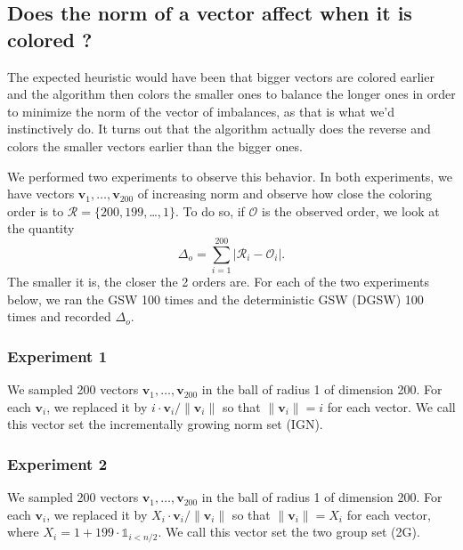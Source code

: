 \documentclass[12pt]{article}
\begin{document}
\subsection{Does the norm of a vector affect when it is colored ?}\label{norm_affect_when}
The expected heuristic would have been that bigger vectors are colored earlier and the algorithm then colors the smaller ones to balance the longer ones in order to minimize the norm of the vector of imbalances, as that is what we'd instinctively do. It turns out that the algorithm actually does the reverse and colors the smaller vectors earlier than the bigger ones.

We performed two experiments to observe this behavior. In both experiments, we have vectors $\textbf{v}_1,\dots,\textbf{v}_{200}$ of increasing norm and observe how close the coloring order is to $\mathcal{R}=\{200,199,$\dots$,1\}$. To do so, if $\mathcal{O}$ is the observed order, we look at the quantity 
\begin{equation}
\Delta_{o}=\sum_{i=1}^{200}|\mathcal{R}_i-\mathcal{O}_i|.
\label{orderdistance}
\end{equation}
The smaller it is, the closer the 2 orders are. For each of the two experiments below, we ran the GSW 100 times and the deterministic GSW (DGSW) 100 times and recorded $\Delta_o$.

\subsubsection{Experiment 1}
We sampled 200 vectors $\textbf{v}_1,\dots,\textbf{v}_{200}$ in the ball of radius 1 of dimension 200. For each $\textbf{v}_i$, we replaced it by $i\cdot \textbf{v}_i/\|\textbf{v}_i\|$ so that $\|\textbf{v}_i\|=i$ for each vector. We call this vector set the incrementally growing norm set (IGN).


\subsubsection{Experiment 2}
We sampled 200 vectors $\textbf{v}_1,\dots,\textbf{v}_{200}$ in the ball of radius 1 of dimension 200. For each $\textbf{v}_i$, we replaced it by $X_i\cdot \textbf{v}_i/\|\textbf{v}_i\|$ so that $\|\textbf{v}_i\|=X_i$ for each vector, where $X_i=1 + 199\cdot\mathds{1}_{i<n/2}$. We call this vector set the two group set (2G).
\end{document}

